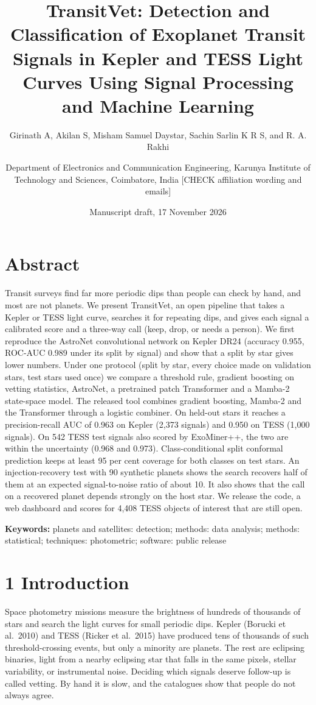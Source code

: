 \documentclass[
]{article}
\title{TransitVet: Detection and Classification of Exoplanet Transit
Signals in Kepler and TESS Light Curves Using Signal Processing and
Machine Learning}
\author{Girinath A, Akilan S, Misham Samuel Daystar, Sachin Sarlin K R
S, and R. A. Rakhi \and Department of Electronics and Communication
Engineering, Karunya Institute of Technology and Sciences, Coimbatore,
India {[}CHECK affiliation wording and emails{]}}
\date{Manuscript draft, 17 November 2026}
\begin{document}
\maketitle

\hypertarget{abstract}{%
\section{Abstract}\label{abstract}}

Transit surveys find far more periodic dips than people can check by
hand, and most are not planets. We present TransitVet, an open pipeline
that takes a Kepler or TESS light curve, searches it for repeating dips,
and gives each signal a calibrated score and a three-way call (keep,
drop, or needs a person). We first reproduce the AstroNet convolutional
network on Kepler DR24 (accuracy 0.955, ROC-AUC 0.989 under its split by
signal) and show that a split by star gives lower numbers. Under one
protocol (split by star, every choice made on validation stars, test
stars used once) we compare a threshold rule, gradient boosting on
vetting statistics, AstroNet, a pretrained patch Transformer and a
Mamba-2 state-space model. The released tool combines gradient boosting,
Mamba-2 and the Transformer through a logistic combiner. On held-out
stars it reaches a precision-recall AUC of 0.963 on Kepler (2,373
signals) and 0.950 on TESS (1,000 signals). On 542 TESS test signals
also scored by ExoMiner++, the two are within the uncertainty (0.968 and
0.973). Class-conditional split conformal prediction keeps at least 95
per cent coverage for both classes on test stars. An injection-recovery
test with 90 synthetic planets shows the search recovers half of them at
an expected signal-to-noise ratio of about 10. It also shows that the
call on a recovered planet depends strongly on the host star. We release
the code, a web dashboard and scores for 4,408 TESS objects of interest
that are still open.

\textbf{Keywords:} planets and satellites: detection; methods: data
analysis; methods: statistical; techniques: photometric; software:
public release

\hypertarget{introduction}{%
\section{1 Introduction}\label{introduction}}

Space photometry missions measure the brightness of hundreds of
thousands of stars and search the light curves for small periodic dips.
Kepler (Borucki et al.~2010) and TESS (Ricker et al.~2015) have produced
tens of thousands of such threshold-crossing events, but only a minority
are planets. The rest are eclipsing binaries, light from a nearby
eclipsing star that falls in the same pixels, stellar variability, or
instrumental noise. Deciding which signals deserve follow-up is called
vetting. By hand it is slow, and the catalogues show that people do not
always agree.
\end{document}
